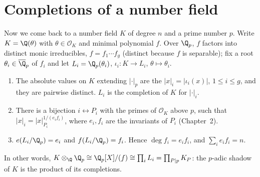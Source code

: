 \section{Completions of a number field}

Now we come back to a number field $K$ of degree $n$ and a prime number $p$. Write $K=\Q(\theta)$ with $\theta\in\mathcal O_K$
and minimal polynomial $f$. Over $\Q_p$, $f$ factors into distinct monic irreducibles, $f=f_1\cdots f_g$ (distinct because $f$ is
separable); fix a root $\theta_i\in\overline{\Q}_p$ of $f_i$ and let $L_i=\Q_p(\theta_i)$, $\iota_i:K\to L_i$, $\theta\mapsto\theta_i$.

\begin{theorem}\label{thm:completions}
\begin{enumerate}[label=(\alph*)]
\item The absolute values on $K$ extending $|\cdot|_p$ are the $|x|_i=|\iota_i(x)|$, $1\le i\le g$, and they are pairwise
distinct. $L_i$ is the completion of $K$ for $|\cdot|_i$.
\item There is a bijection $i\leftrightarrow P_i$ with the primes of $\mathcal O_K$ above $p$, such that $|x|_i=
|x|_{P_i}^{1/(e_if_i)}$, where $e_i,f_i$ are the invariants of $P_i$ (Chapter~2).
\item $e(L_i/\Q_p)=e_i$ and $f(L_i/\Q_p)=f_i$. Hence $\deg f_i=e_if_i$, and $\sum_ie_if_i=n$.
\end{enumerate}
In other words, $K\otimes_\Q\Q_p\cong\Q_p[X]/(f)\cong\prod_i L_i=\prod_{P\mid p}K_P$: the $p$-adic shadow of $K$ is the product of
its completions.
\end{theorem}
